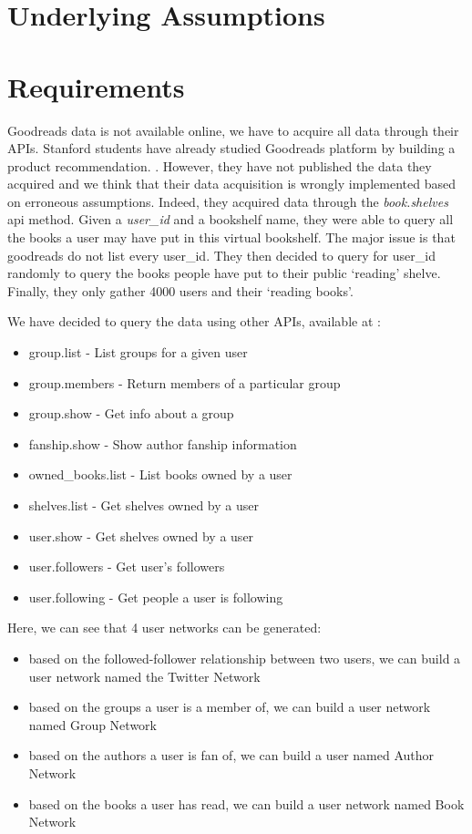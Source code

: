 \documentclass[11pt]{article}
\begin{document}
\section{Underlying Assumptions}
\section{Requirements}

Goodreads data is not available online, we have to acquire all data through their APIs. Stanford students have already studied Goodreads platform by building a product recommendation. \cite{stanford:goodreads}. However, they have not published the data they acquired and we think that their data acquisition is wrongly implemented based on erroneous assumptions. Indeed, they acquired data through the \textit{book.shelves} api method. Given a \textit{user\_id} and a bookshelf name, they were able to query all the books a user may have put in this virtual bookshelf. The major issue is that goodreads do not list every user\_id. They then decided to query for user\_id randomly to query the books people have put to their public `reading' shelve. Finally, they only gather 4000 users and their `reading books'.

We have decided to query the data using other APIs, available at \cite{goodreads:api}:
\begin{itemize}
\item group.list - List groups for a given user
\item group.members - Return members of a particular group
\item group.show - Get info about a group
\item fanship.show - Show author fanship information
\item owned\_books.list - List books owned by a user
\item shelves.list - Get shelves owned by a user
\item user.show - Get shelves owned by a user
\item user.followers - Get user's followers
\item user.following - Get people a user is following
\end{itemize}

Here, we can see that 4 user networks can be generated:
\begin{itemize}
\item based on the followed-follower relationship between two users, we can build a user network named the Twitter Network
\item based on the groups a user is a member of, we can build a user network named Group Network
\item based on the authors a user is fan of, we can build a user named Author Network
\item based on the books a user has read, we can build a user network named Book Network
\end{itemize}
\end{document}
